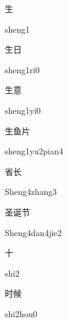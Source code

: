 \begin{verbete}[sheng1]{生}
\begin{pronuncia}{sheng1}
\end{pronuncia}
\end{verbete}

\begin{verbete}[sheng1ri0]{生日}
\begin{pronuncia}{sheng1ri0}
\end{pronuncia}
\end{verbete}

\begin{verbete}[sheng1yi0]{生意}
\begin{pronuncia}{sheng1yi0}
\end{pronuncia}
\end{verbete}

\begin{verbete}{生鱼片}
\begin{pronuncia}{sheng1yu2pian4}
\end{pronuncia}
\end{verbete}

\begin{verbete}{省长}
\begin{pronuncia}{Sheng4zhang3}
\end{pronuncia}
\end{verbete}

\begin{verbete}{圣诞节}
\begin{pronuncia}{Sheng4dan4jie2}
\end{pronuncia}
\end{verbete}

\begin{verbete}[shi2]{十}
\begin{pronuncia}{shi2}
\end{pronuncia}
\end{verbete}

\begin{verbete}{时候}
\begin{pronuncia}{shi2hou0}
\end{pronuncia}
\end{verbete}

